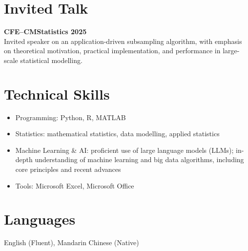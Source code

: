 \documentclass[11pt,a4paper]{article}
\begin{document}
\section*{Invited Talk}

\textbf{CFE--CMStatistics 2025} \\
Invited speaker on an application-driven subsampling algorithm, with emphasis on theoretical motivation,
practical implementation, and performance in large-scale statistical modelling.

\section*{Technical Skills}
\begin{itemize}
\item Programming: Python, R, MATLAB
\item Statistics: mathematical statistics, data modelling, applied statistics
\item Machine Learning \& AI: proficient use of large language models (LLMs); in-depth understanding of machine learning and big data algorithms, including core principles and recent advances
\item Tools: Microsoft Excel, Microsoft Office
\end{itemize}

\section*{Languages}
English (Fluent), Mandarin Chinese (Native)
\end{document}
